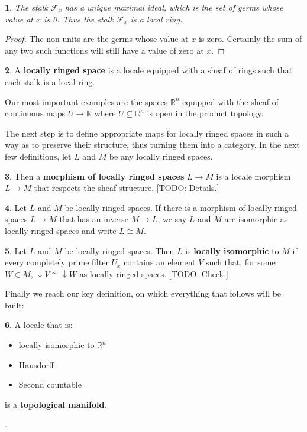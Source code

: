 \documentclass[oneside,english]{amsbook}
\numberwithin{section}{chapter}
\theoremstyle{plain}
\newtheorem{thm}{\protect\theoremname}
\theoremstyle{definition}
\newtheorem{defn}[thm]{\protect\definitionname}
\providecommand{\definitionname}{Definition}
\providecommand{\theoremname}{Theorem}
\begin{document}
\begin{thm}
	The stalk $\mathscr{F}_x$ has a unique maximal ideal, which is the set of germs whose value at $x$ is 0. Thus the stalk $\mathscr{F}_x$ is a local ring.
\end{thm}

\begin{proof}
	The non-units are the germs whose value at $x$ is zero. Certainly the sum of any two such functions will still have a value of zero at $x$.
\end{proof}

\begin{defn}
	A \textbf{locally ringed space} is a locale equipped with a sheaf of rings such that each stalk is a local ring.
\end{defn}

Our most important examples are the spaces $\mathbb{R}^n$ equipped with the sheaf of continuous maps $U\to \mathbb{R}$ where $U\subseteq \mathbb{R}^n$ is open in the product topology. 

The next step is to define appropriate maps for locally ringed spaces in such a way as to preserve their structure, thus turning them into a category. In the next few definitions, let $L$ and $M$ be any locally ringed spaces. 

\begin{defn}
	Then a \textbf{morphism of locally ringed spaces} $L\to M$ is a locale morphism $L\to M$ that respects the sheaf structure.
	[TODO: Details.]
\end{defn}

\begin{defn}
	Let $L$ and $M$ be locally ringed spaces. If there is a morphism of locally ringed spaces $L\to M$ that has an inverse $M\to L$, we say $L$ and $M$ are isomorphic as locally ringed spaces and write $L\cong M$.
\end{defn}

\begin{defn}
	Let $L$ and $M$ be locally ringed spaces. Then $L$ is \textbf{locally isomorphic} to $M$ if every completely prime filter $U_x$ contains an element $V$ such that, for some $W\in M$, $\downarrow V\cong \downarrow W$ as locally ringed spaces.
	[TODO: Check.]
\end{defn}

Finally we reach our key definition, on which everything that follows will be built:

\begin{defn}
	A locale that is:
	\begin{itemize}
		\item{locally isomorphic to $\mathbb{R}^n$}
		\item{Hausdorff}
		\item{Second countable}
	\end{itemize}
	is a \textbf{topological manifold}.
\end{defn}.
\end{document}

